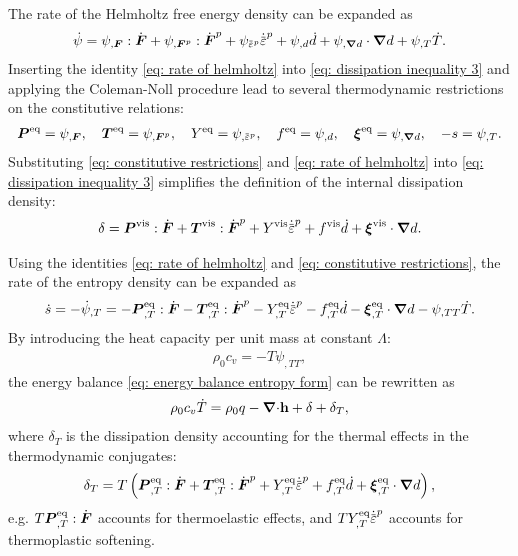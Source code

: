 The rate of the Helmholtz free energy density can be expanded as
\begin{align}
  \dot{\psi} = \psi_{,\defgrad}:\dot{\defgrad} + \psi_{,\defgrad^p}:\dot{\defgrad}^p + \psi_{\ep}\epdot + \psi_{,d}\dot{d} + \psi_{,\grad d}\cdot\grad d + \psi_{,T}\dot{T}. \label{eq: rate of helmholtz}
\end{align}
Inserting the identity \eqref{eq: rate of helmholtz} into \eqref{eq: dissipation inequality 3} and applying the Coleman-Noll procedure lead to several thermodynamic restrictions on the constitutive relations:
\begin{align}
  \bfP^\text{eq} = \psi_{,\defgrad}, \quad \bfT^\text{eq} = \psi_{,\defgrad^p}, \quad Y^\text{eq} = \psi_{,\ep}, \quad f^\text{eq} = \psi_{,d}, \quad \bs{\xi}^\text{eq} = \psi_{,\grad d}, \quad -s = \psi_{,T}. \label{eq: constitutive restrictions}
\end{align}
Substituting \eqref{eq: constitutive restrictions} and \eqref{eq: rate of helmholtz} into \eqref{eq: dissipation inequality 3} simplifies the definition of the internal dissipation density:
\begin{align}
  \delta = \bfP^\text{vis}:\dot{\defgrad} + \bfT^\text{vis}:\dot{\defgrad}^p + Y^\text{vis}\epdot + f^\text{vis}\dot{d} + \bs{\xi}^\text{vis}\cdot\grad d.
\end{align}

Using the identities \eqref{eq: rate of helmholtz} and \eqref{eq: constitutive restrictions}, the rate of the entropy density can be expanded as
\begin{align}
  \dot{s} = -\dot{\psi}_{,T} = - \bfP^\text{eq}_{,T}:\dot{\defgrad} - \bfT^\text{eq}_{,T}:\dot{\defgrad}^p - Y^\text{eq}_{,T}\epdot - f^\text{eq}_{,T}\dot{d} - \bs{\xi}^\text{eq}_{,T}\cdot\grad d - \psi_{,TT} \dot{T}. \label{eq: expanding s dot}
\end{align}
By introducing the heat capacity per unit mass at constant $\Lambda$:
\begin{align}
  \rho_0c_v = -T\psi_{,TT}, \label{eq: heat capacity}
\end{align}
the energy balance \eqref{eq: energy balance entropy form} can be rewritten as
\begin{align}
  \rho_0 c_v \dot{T} = \rho_0 q - {\boldsymbol{\nabla} \cdot} \textbf{h} + \delta + \delta_T, \label{eq: energy balance temperature form}
\end{align}
where $\delta_T$ is the dissipation density accounting for the thermal effects in the thermodynamic conjugates:
\begin{align}
  \delta_T = T\left( \bfP^\text{eq}_{,T}:\dot{\defgrad} + \bfT^\text{eq}_{,T}:\dot{\defgrad}^p + Y^\text{eq}_{,T}\epdot + f^\text{eq}_{,T}\dot{d} + \bs{\xi}^\text{eq}_{,T}\cdot\grad d \right), \label{eq: heat generation due to energetic terms}
\end{align}
e.g. $T\boldsymbol{P}^\text{eq}_{,T}:\dot{\boldsymbol{F}}$ accounts for thermoelastic effects, and $TY^\text{eq}_{,T}\epdot$ accounts for thermoplastic softening.
